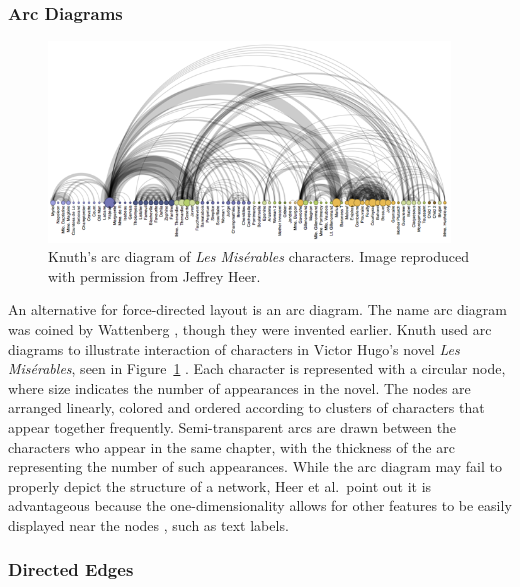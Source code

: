 \subsubsection{Arc Diagrams}

\begin{figure}[h]
	\centering
	\includegraphics[width=0.95\textwidth]{figures/png/arcdiagram.png}
	\caption[Knuth's arc diagram of \textit{Les Mis\'erables} characters]{Knuth's arc diagram of \textit{Les Mis\'erables} characters.  Image reproduced with permission from Jeffrey Heer.}
	\label{fig:arcdiagram}
\end{figure}

An alternative for force-directed layout is an arc diagram.  The name arc diagram was coined by Wattenberg \citeyearpar{wattenberg2002}, though they were invented earlier.  Knuth used arc diagrams to illustrate interaction of characters in Victor Hugo's novel \textit{Les} \textit{Mis\'erables}, seen in Figure~\ref{fig:arcdiagram} \citeyearpar{knuth1993}.  Each character is represented with a circular node, where size indicates the number of appearances in the novel.  The nodes are arranged linearly, colored and ordered according to clusters of characters that appear together frequently.  Semi-transparent arcs are drawn between the characters who appear in the same chapter, with the thickness of the arc representing the number of such appearances.  While the arc diagram may fail to properly depict the structure of a network, Heer et al.\ point out it is advantageous because the one-dimensionality allows for other features to be easily displayed near the nodes \citeyearpar{heer2010}, such as text labels.

\subsubsection{Directed Edges}

